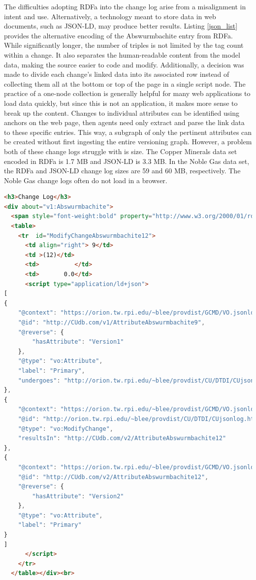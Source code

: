 The difficulties adopting RDFa into the change log arise from a misalignment in intent and use.
Alternatively, a technology meant to store data in web documents, such as JSON-LD, may produce better results.
Listing \ref{json_list} provides the alternative encoding of the Abswurmbachite entry from RDFa.
While significantly longer, the number of triples is not limited by the tag count within a change.
It also separates the human-readable content from the model data, making the source easier to code and modify.
Additionally, a decision was made to divide each change's linked data into its associated row instead of collecting them all at the bottom or top of the page in a single script node.
The practice of a one-node collection is generally helpful for many web applications to load data quickly, but since this is not an application, it makes more sense to break up the content.
Changes to individual attributes can be identified using anchors on the web page, then agents need only extract and parse the link data to these specific entries.
This way, a subgraph of only the pertinent attributes can be created without first ingesting the entire versioning graph.
However, a problem both of these change logs struggle with is size.
The Copper Minerals data set encoded in RDFa is 1.7 MB and JSON-LD is 3.3 MB.
In the Noble Gas data set, the RDFa and JSON-LD change log sizes are 59 and 60 MB, respectively.
The Noble Gas change logs often do not load in a browser.

\begin{lstlisting}[language=HTML, caption=Abswurmbachite JSON-LD, label=json_list]
<h3>Change Log</h3>
<div about="v1:Abswurmbachite">
  <span style="font-weight:bold" property="http://www.w3.org/2000/01/rdf-schema#label">Abswurmbachite</span>
  <table>
    <tr  id="ModifyChangeAbswurmbachite12">
      <td align="right"> 9</td>
      <td >(12)</td>
      <td>          </td>
      <td>       0.0</td>
      <script type="application/ld+json">
[
{
	"@context": "https://orion.tw.rpi.edu/~blee/provdist/GCMD/VO.jsonld", 
	"@id": "http://CUdb.com/v1/AttributeAbswurmbachite9", 
	"@reverse": {
		"hasAttribute": "Version1"
	}, 
	"@type": "vo:Attribute", 
	"label": "Primary", 
	"undergoes": "http://orion.tw.rpi.edu/~blee/provdist/CU/DTDI/CUjsonlog.html#ModifyChangeAbswurmbachite12"
}, 
{
	"@context": "https://orion.tw.rpi.edu/~blee/provdist/GCMD/VO.jsonld", 
	"@id": "http://orion.tw.rpi.edu/~blee/provdist/CU/DTDI/CUjsonlog.html#ModifyChangeAbswurmbachite12", 
	"@type": "vo:ModifyChange", 
	"resultsIn": "http://CUdb.com/v2/AttributeAbswurmbachite12"
}, 
{
	"@context": "https://orion.tw.rpi.edu/~blee/provdist/GCMD/VO.jsonld", 
	"@id": "http://CUdb.com/v2/AttributeAbswurmbachite12", 
	"@reverse": {
		"hasAttribute": "Version2"
	}, 
	"@type": "vo:Attribute", 
	"label": "Primary"
}
]
      </script>
    </tr>
  </table></div><br>
\end{lstlisting}

